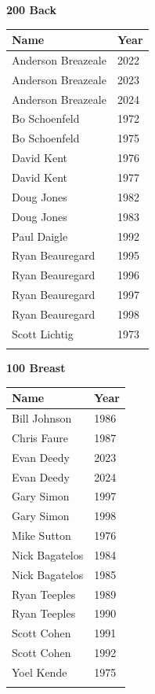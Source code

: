 \vspace{1.2em}
\noindent\begin{minipage}[t]{0.48\textwidth}
\centering
\textbf{\textcolor{teamprimary}{200 Back}}\par
\vspace{0.5em}
\centering
\small
\renewcommand{\arraystretch}{1.0}
\setlength{\tabcolsep}{4pt}
\begin{tabular}{@{}p{3.0cm}p{1.0cm}@{}}
\toprule
\textbf{Name} & \textbf{Year} \\
\midrule
Anderson Breazeale & 2022 \\
Anderson Breazeale & 2023 \\
Anderson Breazeale & 2024 \\
Bo Schoenfeld & 1972 \\
Bo Schoenfeld & 1975 \\
David Kent & 1976 \\
David Kent & 1977 \\
Doug Jones & 1982 \\
Doug Jones & 1983 \\
Paul Daigle & 1992 \\
Ryan Beauregard & 1995 \\
Ryan Beauregard & 1996 \\
Ryan Beauregard & 1997 \\
Ryan Beauregard & 1998 \\
Scott Lichtig & 1973 \\
\bottomrule
\vspace{0.5em}
\end{tabular}
\end{minipage}
\hfill
\begin{minipage}[t]{0.48\textwidth}
\centering
\textbf{\textcolor{teamprimary}{100 Breast}}\par
\vspace{0.5em}
\centering
\small
\renewcommand{\arraystretch}{1.0}
\setlength{\tabcolsep}{4pt}
\begin{tabular}{@{}p{3.0cm}p{1.0cm}@{}}
\toprule
\textbf{Name} & \textbf{Year} \\
\midrule
Bill Johnson & 1986 \\
Chris Faure & 1987 \\
Evan Deedy & 2023 \\
Evan Deedy & 2024 \\
Gary Simon & 1997 \\
Gary Simon & 1998 \\
Mike Sutton & 1976 \\
Nick Bagatelos & 1984 \\
Nick Bagatelos & 1985 \\
Ryan Teeples & 1989 \\
Ryan Teeples & 1990 \\
Scott Cohen & 1991 \\
Scott Cohen & 1992 \\
Yoel Kende & 1975 \\
\bottomrule
\vspace{0.5em}
\end{tabular}
\end{minipage}
